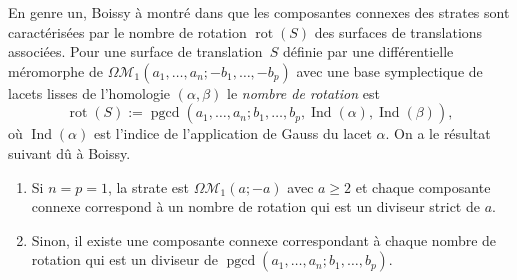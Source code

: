 \documentclass[11pt]{article}
\numberwithin{equation}{section}\renewcommand{\proofname}{Démonstration}
\let\mathcal\mathscr
\newenvironment{enumeratei}
{\bgroup\def\theenumi{\roman{enumi}}\def\theenumii{\arabic{enumii}}\begin{enumerate}}
{\end{enumerate}\egroup}
\DeclareMathOperator{\pgcd}{pgcd}
\DeclareMathOperator{\rot}{rot}
\DeclareMathOperator{\ind}{Ind}
\newcommand{\omoduli}[1][g]{{\Omega\mathcal M}_{\!#1}}
\theoremstyle{definition}
\begin{document}
En genre un, Boissy à montré dans \cite[\S4.2]{Bo} que les composantes connexes des strates sont caractérisées par le nombre de rotation $\rot(S)$ des surfaces de translations associées. Pour une surface de translation~$S$ définie par une différentielle méromorphe de $\omoduli[1](a_{1},\dots,a_{n};-b_{1},\dots,-b_{p})$ avec une base symplectique de lacets lisses de l'homologie $(\alpha,\beta)$ le \emph{nombre de rotation} est \[
\rot(S):=\pgcd(a_{1},\dots,a_{n};b_{1},\dots,b_{p},\ind(\alpha),\ind(\beta)),\] où $\ind(\alpha)$ est l'indice de l’application de Gauss du lacet $\alpha$. On a le résultat suivant dû à Boissy.
\begin{enumeratei}
\item
Si $n=p=1$, la strate est $\omoduli[1](a;-a)$ avec $a\geq2$ et chaque composante connexe correspond à un nombre de rotation qui est un diviseur strict de $a$.
\item
Sinon, il existe une composante connexe correspondant à chaque nombre de rotation qui est un diviseur de $\pgcd(a_{1},\dots,a_{n};b_{1},\dots,b_{p})$.
\end{enumeratei}
\end{document}
